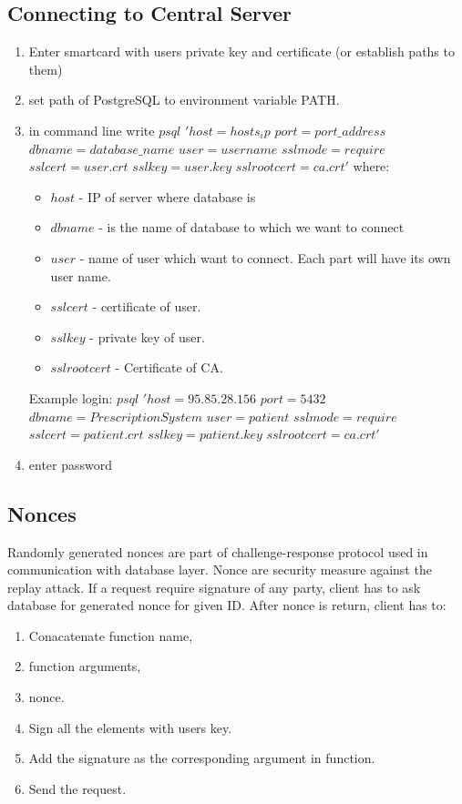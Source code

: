 \subsection{Connecting to Central Server}\label{sec:login}
\begin{enumerate}
\item Enter smartcard with users private key and certificate (or establish paths to them)
\item set path of PostgreSQL to environment variable PATH.

\item in command line write $psql$ $'host=hosts_ip$ $port=port\_address$ $dbname=database\_name$ $user=username$ $sslmode=require$ $sslcert=user.crt$ $sslkey=user.key$ $sslrootcert=ca.crt'$ where:
	\begin{itemize}
	\item $host$ - IP of server where database is
	\item $dbname$ - is the name of database to which we want to connect
	\item $user$ - name of user which want to connect. Each part will have its own user name.
	\item $sslcert$ - certificate of user.
	\item $sslkey$ - private key of user.
	\item $sslrootcert$ - Certificate of CA.
	\end{itemize}
	Example login: $psql$ $'host=95.85.28.156$ $port=5432$ $dbname=PrescriptionSystem$ $user=patient$ $sslmode=require$ $sslcert=patient.crt$ $sslkey=patient.key$ $sslrootcert=ca.crt'$
\item enter password
\end{enumerate}

\subsection{Nonces}

Randomly generated nonces are part of challenge-response protocol used in communication with database layer. Nonce are security measure against the replay attack. If a request require signature of any party, client has to ask database for generated nonce for given ID. After nonce is return, client has to:
\begin{enumerate}
 \item Conacatenate function name,
 \item function arguments,
 \item nonce.
 \item Sign all the elements with users key.
 \item Add the signature as the corresponding argument in function.
 \item Send the request.
\end{enumerate}

